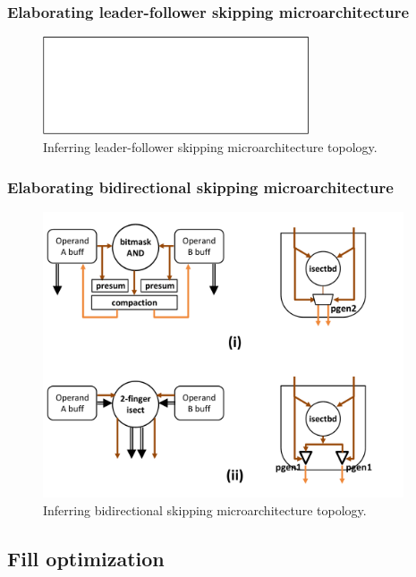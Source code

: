 \subsubsection{Elaborating leader-follower skipping microarchitecture}

\begin{figure}[ht]
    \centering
    \includegraphics[width=0.7\textwidth]{figures/prior_lf_skip.pdf}
    \caption{Inferring leader-follower skipping microarchitecture topology.}
    \label{fig:prior_lf_skip}
\end{figure}

\subsubsection{Elaborating bidirectional skipping microarchitecture}

\begin{figure}[ht]
    \centering
    \includegraphics[width=0.95\textwidth]{figures/prior_bd_skip.pdf}
    \caption{Inferring bidirectional skipping microarchitecture topology.}
    \label{fig:prior_bd_skip}
\end{figure}

\subsection{Fill optimization}

